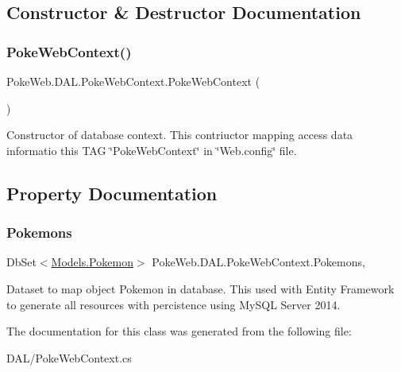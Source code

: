 \subsection{Constructor \& Destructor Documentation}
\mbox{\label{class_poke_web_1_1_d_a_l_1_1_poke_web_context_ad657dbdf7487f5fb5c13fde61726fe3d}} 
\subsubsection{\texorpdfstring{Poke\+Web\+Context()}{PokeWebContext()}}
{\footnotesize\ttfamily Poke\+Web.\+D\+A\+L.\+Poke\+Web\+Context.\+Poke\+Web\+Context (\begin{DoxyParamCaption}{ }\end{DoxyParamCaption})\hspace{0.3cm}{\ttfamily [inline]}}

Constructor of database context. This contriuctor mapping access data informatio this T\+AG \char`\"{}\+Poke\+Web\+Context\char`\"{} in \char`\"{}\+Web.\+config\char`\"{} file. 

\subsection{Property Documentation}
\mbox{\label{class_poke_web_1_1_d_a_l_1_1_poke_web_context_ac3e453f7ae2467d1910a0db7e074dc93}} 
\subsubsection{\texorpdfstring{Pokemons}{Pokemons}}
{\footnotesize\ttfamily Db\+Set$<$\mbox{\hyperlink{class_poke_web_1_1_models_1_1_pokemon}{Models.\+Pokemon}}$>$ Poke\+Web.\+D\+A\+L.\+Poke\+Web\+Context.\+Pokemons\hspace{0.3cm}{\ttfamily [get]}, {\ttfamily [set]}}

Dataset to map object Pokemon in database. This used with Entity Framework to generate all resources with percistence using My\+S\+QL Server 2014. 

The documentation for this class was generated from the following file\+:\begin{DoxyCompactItemize}
\item 
D\+A\+L/Poke\+Web\+Context.\+cs\end{DoxyCompactItemize}
